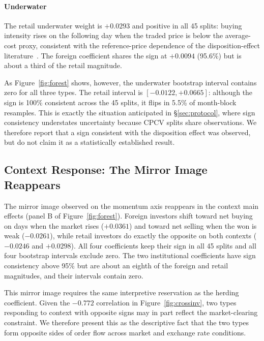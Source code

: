 \paragraph{Underwater}
The retail underwater weight is $+0.0293$ and positive in all 45 splits: buying
intensity rises on the following day when the traded price is below the
average-cost proxy, consistent with the reference-price dependence of the
disposition-effect literature~\cite{shefrin1985disposition,odean1998investors}.
The foreign coefficient shares the sign at $+0.0094$ (95.6\%) but is about a
third of the retail magnitude.

As Figure~\ref{fig:forest} shows, however, the underwater bootstrap interval
contains zero for all three types. The retail interval is
$[-0.0122,+0.0665]$: although the sign is 100\% consistent across the 45 splits,
it flips in 5.5\% of month-block resamples. This is exactly the situation
anticipated in \S\ref{sec:protocol}, where sign consistency understates
uncertainty because CPCV splits share observations. We therefore report that a
sign consistent with the disposition effect was observed, but do not claim it as
a statistically established result.

\subsection{Context Response: The Mirror Image Reappears}
\label{sec:alpha}

The mirror image observed on the momentum axis reappears in the context main
effects (panel B of Figure~\ref{fig:forest}). Foreign investors shift toward net
buying on days when the market rises ($+0.0361$) and toward net selling when the
won is weak ($-0.0261$), while retail investors do exactly the opposite on both
contexts ($-0.0246$ and $+0.0298$). All four coefficients keep their sign in all
45 splits and all four bootstrap intervals exclude zero. The two institutional
coefficients have sign consistency above 95\% but are about an eighth of the
foreign and retail magnitudes, and their intervals contain zero.

This mirror image requires the same interpretive reservation as the herding
coefficient. Given the $-0.772$ correlation in Figure~\ref{fig:crossinv}, two
types responding to context with opposite signs may in part reflect the
market-clearing constraint. We therefore present this as the descriptive fact
that the two types form opposite sides of order flow across market and exchange
rate conditions.

